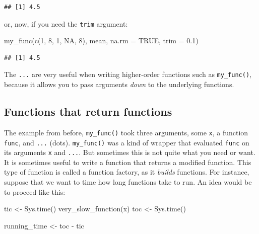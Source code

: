 \documentclass[
]{article}
\newenvironment{Shaded}{\begin{snugshade}}{\end{snugshade}}
\newcommand{\AttributeTok}[1]{\textcolor[rgb]{0.77,0.63,0.00}{#1}}
\newcommand{\ConstantTok}[1]{\textcolor[rgb]{0.00,0.00,0.00}{#1}}
\newcommand{\DecValTok}[1]{\textcolor[rgb]{0.00,0.00,0.81}{#1}}
\newcommand{\FloatTok}[1]{\textcolor[rgb]{0.00,0.00,0.81}{#1}}
\newcommand{\FunctionTok}[1]{\textcolor[rgb]{0.00,0.00,0.00}{#1}}
\newcommand{\NormalTok}[1]{#1}
\newcommand{\OtherTok}[1]{\textcolor[rgb]{0.56,0.35,0.01}{#1}}
\newcommand{\SpecialCharTok}[1]{\textcolor[rgb]{0.00,0.00,0.00}{#1}}
\begin{document}
\begin{verbatim}
## [1] 4.5
\end{verbatim}

or, now, if you need the \texttt{trim} argument:

\begin{Shaded}
\begin{Highlighting}[]
\FunctionTok{my\_func}\NormalTok{(}\FunctionTok{c}\NormalTok{(}\DecValTok{1}\NormalTok{, }\DecValTok{8}\NormalTok{, }\DecValTok{1}\NormalTok{, }\ConstantTok{NA}\NormalTok{, }\DecValTok{8}\NormalTok{), mean, }\AttributeTok{na.rm =} \ConstantTok{TRUE}\NormalTok{, }\AttributeTok{trim =} \FloatTok{0.1}\NormalTok{)}
\end{Highlighting}
\end{Shaded}

\begin{verbatim}
## [1] 4.5
\end{verbatim}

The \texttt{...} are very useful when writing higher-order functions such as \texttt{my\_func()}, because it allows
you to pass arguments \emph{down} to the underlying functions.

\hypertarget{functions-that-return-functions}{%
\subsection{Functions that return functions}\label{functions-that-return-functions}}

The example from before, \texttt{my\_func()} took three arguments, some \texttt{x}, a function \texttt{func}, and \texttt{...} (dots). \texttt{my\_func()}
was a kind of wrapper that evaluated \texttt{func} on its arguments \texttt{x} and \texttt{...}. But sometimes this is not quite what you
need or want. It is sometimes useful to write a function that returns a modified function. This type of function
is called a function factory, as it \emph{builds} functions. For instance, suppose that we want to time how long functions
take to run. An idea would be to proceed like this:

\begin{Shaded}
\begin{Highlighting}[]
\NormalTok{tic }\OtherTok{\textless{}{-}} \FunctionTok{Sys.time}\NormalTok{()}
\FunctionTok{very\_slow\_function}\NormalTok{(x)}
\NormalTok{toc }\OtherTok{\textless{}{-}} \FunctionTok{Sys.time}\NormalTok{()}

\NormalTok{running\_time }\OtherTok{\textless{}{-}}\NormalTok{ toc }\SpecialCharTok{{-}}\NormalTok{ tic}
\end{Highlighting}
\end{Shaded}
\end{document}
